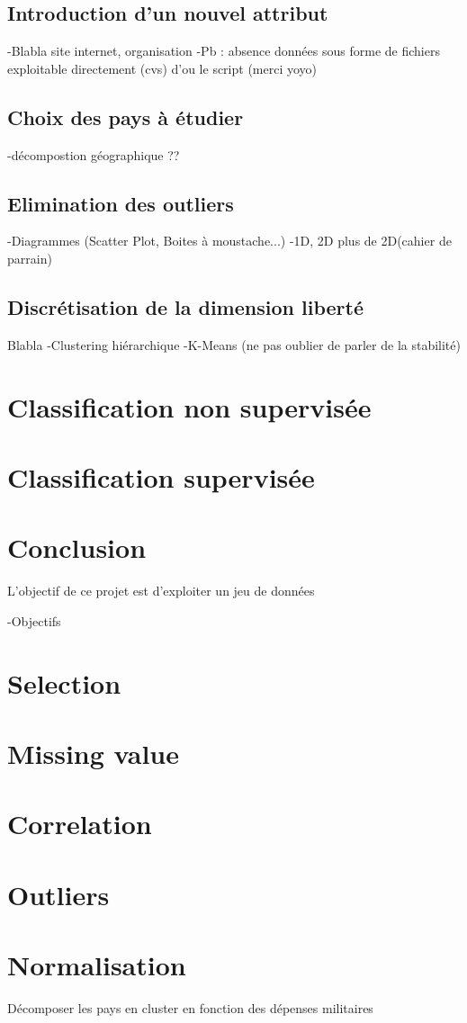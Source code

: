 \subsection{Introduction d'un nouvel attribut}
-Blabla site internet, organisation
-Pb : absence données sous forme de fichiers exploitable directement (cvs) d'ou le script (merci yoyo)
\subsection{Choix des pays à étudier}
-décompostion géographique ??

\subsection{Elimination des outliers}
-Diagrammes (Scatter Plot, Boites à moustache...)
-1D, 2D plus de 2D(cahier de parrain)
\subsection{Discrétisation de la dimension \og liberté \fg}
Blabla
-Clustering hiérarchique
-K-Means (ne pas oublier de parler de la stabilité)
\section{Classification non supervisée}
\section{Classification supervisée}
\section{Conclusion}



L'objectif de ce projet est d'exploiter un jeu de données	
	
-Objectifs

\section{Selection}

\section{Missing value}
\section{Correlation}
\section{Outliers}

\section{Normalisation}


Décomposer les pays en cluster en fonction des dépenses militaires



